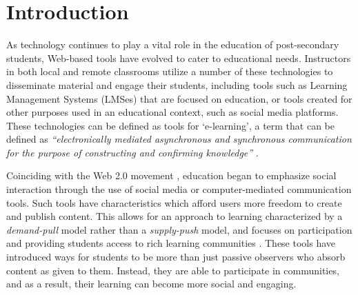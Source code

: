 \chapter{Introduction}



As technology continues to play a vital role in the education of post-secondary students, Web-based tools have evolved to cater to educational needs. Instructors in both local and remote classrooms utilize a number of these technologies to disseminate material and engage their students, including tools such as Learning Management Systems (LMSes) that are focused on education, or tools created for other purposes used in an educational context, such as social media platforms. These technologies can be defined as tools for `e-learning', a term that can be defined as \textit{``electronically mediated asynchronous and synchronous communication for the purpose of constructing and confirming knowledge''} \cite{garrison2011learning}.

Coinciding with the Web 2.0 movement \cite{O'Reilly-What-2005}, education began to emphasize social interaction through the use of social media or computer-mediated communication tools. Such tools have characteristics which afford users more freedom to create and publish content. This allows for an approach to learning characterized by a \emph{demand-pull} model rather than a \emph{supply-push} model, and focuses on participation and providing students access to rich learning communities \cite{seely2008open}. These tools have introduced ways for students to be more than just passive observers who absorb content as given to them. Instead, they are able to participate in communities, and as a result, their learning can become more social and engaging.




